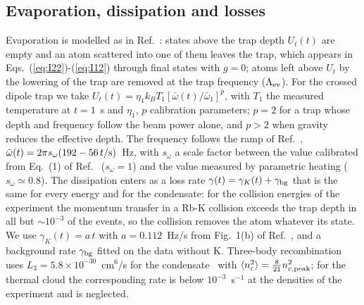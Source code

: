 \subsection{Evaporation, dissipation and losses}
Evaporation is modelled as in Ref.~\cite{Luiten1996}: states above the trap
depth $U_t(t)$ are empty and an atom scattered into one of them leaves the
trap, which appears in Eqs.~(\ref{eq:I22})-(\ref{eq:I12}) through final states
with $g=0$; atoms left above $U_t$ by the lowering of the trap are removed at
the trap frequency ($\Lambda_{\rm ev}$). For the crossed dipole trap we take
$U_t(t)=\eta_1k_BT_1[\bar\omega(t)/\bar\omega_1]^{p}$, with $T_1$ the measured
temperature at $t=1$~s and $\eta_1$, $p$ calibration parameters; $p=2$ for a
trap whose depth and frequency follow the beam power alone, and $p>2$ when
gravity reduces the effective depth. The frequency follows the ramp of
Ref.~\cite{MelladoMunoz2020}, $\bar\omega(t)=2\pi s_\omega(192-56\,t/{\rm s})$~Hz,
with $s_\omega$ a scale factor between the value calibrated from Eq.~(1) of
Ref.~\cite{MelladoMunoz2020} ($s_\omega=1$) and the value measured by parametric
heating ($s_\omega\simeq0.8$). The dissipation enters as a loss rate
$\gamma(t)=\gamma_K(t)+\gamma_{\rm bg}$ that is the same for every energy and
for the condensate: for the collision energies of the experiment the
momentum transfer in a Rb-K collision exceeds the trap depth in all but
$\sim10^{-3}$ of the events, so the collision removes the atom whatever its
state. We use $\gamma_K(t)=a\,t$ with $a=0.112$~Hz/s from Fig.~1(b) of
Ref.~\cite{MelladoMunoz2020}, and a background rate $\gamma_{\rm bg}$ fitted
on the data without K. Three-body recombination uses
$L_3=5.8\times10^{-30}$~cm$^6$/s for the condensate~\cite{Burt1997,Soding1999}
with $\langle n_c^2\rangle=\tfrac{8}{21}n_{c,{\rm peak}}^2$; for the thermal cloud
the corresponding rate is below $10^{-3}$~s$^{-1}$ at the densities of the
experiment and is neglected.

